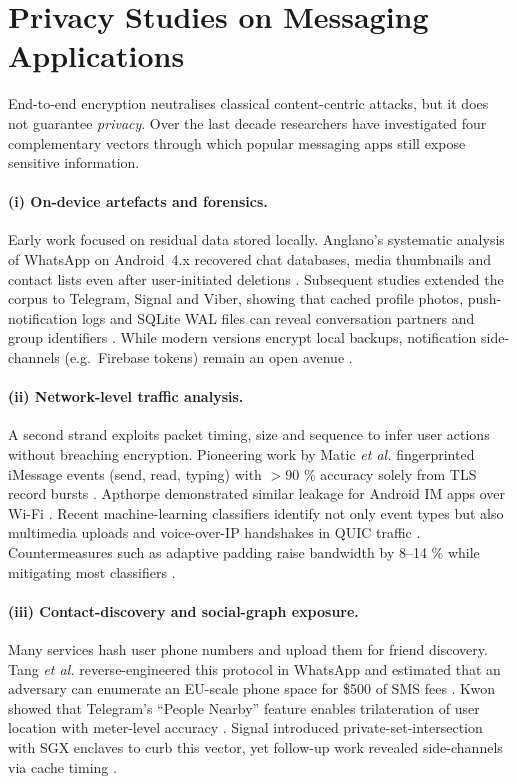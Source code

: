 \documentclass[a4paper,12pt]{report}
\begin{document}
\section{Privacy Studies on Messaging Applications}
\label{sec:rw:privacy-im}

End-to-end encryption neutralises classical content-centric attacks, but it
does not guarantee \emph{privacy}.  Over the last decade researchers have
investigated four complementary vectors through which popular messaging
apps still expose sensitive information.

\paragraph{(i) On-device artefacts and forensics.}
Early work focused on residual data stored locally.
Anglano’s systematic analysis of WhatsApp on Android~4.x recovered chat
databases, media thumbnails and contact lists even after user‐initiated
deletions \cite{anglano2015whatsapp}.
Subsequent studies extended the corpus to Telegram, Signal and Viber,
showing that cached profile photos, push-notification logs and SQLite WAL
files can reveal conversation partners and group identifiers
\cite{moltchanov2018telegram, obermeier2018signal}.
While modern versions encrypt local backups, notification side-channels
(e.g.\ Firebase tokens) remain an open avenue \cite{berezowski2020push}.

\paragraph{(ii) Network-level traffic analysis.}
A second strand exploits packet timing, size and sequence to infer user
actions without breaching encryption.
Pioneering work by Matic \emph{et al.} fingerprinted iMessage events
(send, read, typing) with $>90$ \% accuracy solely from TLS record
bursts \cite{matic2015iMessage}.
Apthorpe demonstrated similar leakage for Android IM apps over Wi-Fi
\cite{apthorpe2018smart}.
Recent machine-learning classifiers identify not only event types but also
multimedia uploads and voice-over-IP handshakes in QUIC traffic
\cite{lee2023quic}.
Countermeasures such as adaptive padding raise bandwidth by 8–14 \%
while mitigating most classifiers \cite{poblete2021defence}.

\paragraph{(iii) Contact-discovery and social-graph exposure.}
Many services hash user phone numbers and upload them for friend
discovery.  Tang \emph{et al.} reverse-engineered this protocol in
WhatsApp and estimated that an adversary can enumerate an EU-scale phone
space for \$500 of SMS fees \cite{tang2020whatsappHash}.
Kwon showed that Telegram’s “People Nearby” feature enables trilateration
of user location with meter-level accuracy \cite{kwon2021telegram}.  Signal
introduced private-set‐intersection with SGX enclaves to curb this vector,
yet follow-up work revealed side-channels via cache timing
\cite{marforio2022psi}.
\end{document}
